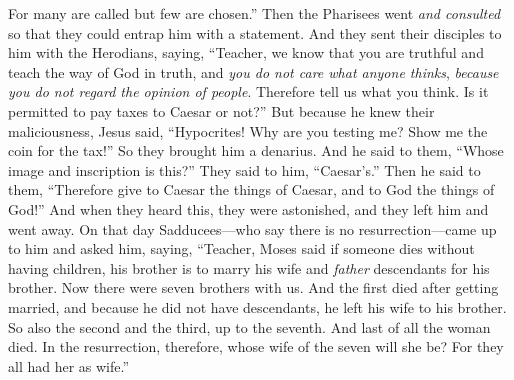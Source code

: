 \begin{biblechapter}
\verse For many are called but few are chosen.”
 Then the Pharisees went \textit{and consulted} so that they could entrap him with a statement.
\verse And they sent their disciples to him with the Herodians, saying, “Teacher, we know that you are truthful and teach the way of God in truth, and \textit{you do not care what anyone thinks}, \textit{because you do not regard the opinion of people}.
\verse Therefore tell us what you think. Is it permitted to pay taxes to Caesar or not?”
\verse But because he knew their maliciousness, Jesus said, “Hypocrites! Why are you testing me?
\verse Show me the coin for the tax!” So they brought him a denarius.
\verse And he said to them, “Whose image and inscription is this?”
\verse They said to him, “Caesar’s.” Then he said to them, “Therefore give to Caesar the things of Caesar, and to God the things of God!”
\verse And when they heard this, they were astonished, and they left him and went away.
 On that day Sadducees—who say there is no resurrection—came up to him and asked him,
\verse saying, “Teacher, Moses said if someone dies without having children, his brother is to marry his wife and \textit{father} descendants for his brother.
\verse Now there were seven brothers with us. And the first died after getting married, and because he did not have descendants, he left his wife to his brother.
\verse So also the second and the third, up to the seventh.
\verse And last of all the woman died.
\verse In the resurrection, therefore, whose wife of the seven will she be? For they all had her as wife.”

\end{biblechapter}
